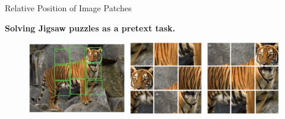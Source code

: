 \begin{frame}[allowframebreaks]{Relative Position of Image Patches}
    \framebreak

    \textbf{Solving Jigsaw puzzles as a pretext task.}

    \begin{figure}
        \centering
        \includegraphics[width=\linewidth,height=0.9\textheight,keepaspectratio]{images/ssl/slide_32_1_img.png}
    \end{figure}
\end{frame}